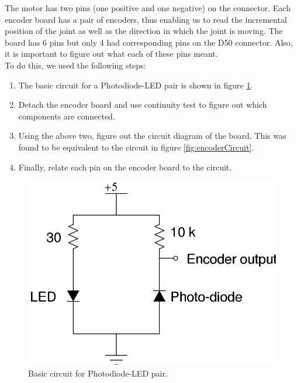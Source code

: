 \documentclass[10pt,a4paper]{article}
\begin{document}
The motor has two pins (one positive and one negative) on the
connector. Each encoder board has a pair of encoders, thus enabling us
to read the incremental position of the joint as well as the direction
in which the joint is moving. The board has 6 pins but only 4 had
corresponding pins on the D50 connector. Also, it is important to
figure out what each of these pins meant.\\

To do this, we used the following steps:
\begin{enumerate}
\item The basic circuit for a Photodiode-LED pair is shown in figure
  \ref{fig:photodiodeLEDPair}. 
\item Detach the encoder board and use continuity test to figure out
  which components are connected.
\item Using the above two, figure out the circuit diagram of the
  board. This was found to be equivalent to the circuit in figure
  \ref{fig:encoderCircuit}. 
\item Finally, relate each pin on the encoder board to the
  circuit. 
\end{enumerate}

\begin{figure}[H]
    \centering
    \includegraphics[scale=0.5]{SimpleEncoder.jpg}
    \caption{Basic circuit for Photodiode-LED pair.}
    \label{fig:photodiodeLEDPair}
\end{figure}
\end{document}
